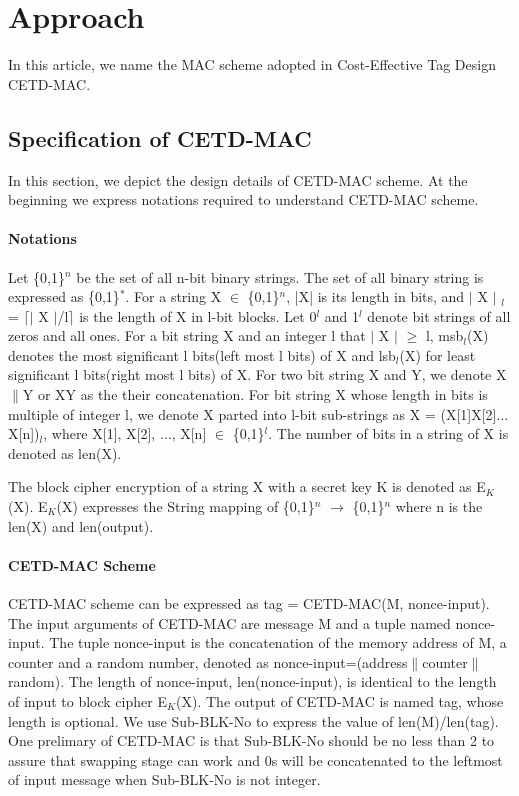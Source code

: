 \documentclass{article}
\begin{document}
\section{Approach}
In this article, we name the MAC scheme adopted in Cost-Effective Tag Design\cite{} CETD-MAC. 
\subsection{Specification of CETD-MAC}
In this section, we depict the design details of CETD-MAC scheme. At the beginning we express notations required to understand CETD-MAC scheme. 

\paragraph{Notations}
Let \{0,1\}$^n$ be the set of all n-bit binary strings. The set of all binary string is expressed as \{0,1\}$^*$.  
For a string X $\in$ \{0,1\}$^n$, |X| is its length in bits, and $\vert$ X $\vert$ $_l$ = $\lceil$$\vert$ X $\vert$/l$\rceil$ is the length of X in l-bit blocks.  Let 0$^l$ and 1$^l$ denote bit strings of all zeros and all ones. 
For a bit string X and an integer l that $\vert$ X $\vert$ $\geq$ l, msb$_l$(X) denotes the most significant l bits(left most l bits) of X and lsb$_l$(X) for least significant l bits(right most l bits) of X.
For two bit string X and Y, we denote X$\|$Y  or XY as the their concatenation. For bit string X whose length in bits is multiple of integer l, we denote X parted into l-bit sub-strings as X = (X[1]X[2]$\ldots$X[n])$_l$, where X[1], X[2], $\ldots$, X[n] $\in$ \{0,1\}$^l$.
The number of bits in a string of X is denoted as len(X).

The block cipher encryption of a string X with a secret key K is denoted as E$_K$(X). E$_K$(X) expresses the String mapping of \{0,1\}$^n$ $\rightarrow$ \{0,1\}$^n$ where n is the len(X) and len(output).
\paragraph{CETD-MAC Scheme}
CETD-MAC scheme can be expressed as tag = CETD-MAC(M, nonce-input). The input arguments of CETD-MAC are message M and a tuple named nonce-input. The tuple nonce-input is the concatenation of the memory address of M, a counter and a random number, denoted as nonce-input=(address$\|$counter$\|$random). The length of nonce-input, len(nonce-input), is identical to the length of input to block cipher E$_K$(X). The output of CETD-MAC is named tag, whose length is optional. We use Sub-BLK-No to express the value of len(M)/len(tag). One prelimary of CETD-MAC is that Sub-BLK-No should be no less than 2 to assure that swapping stage can work and 0s will be concatenated to the leftmost of input message when Sub-BLK-No is not integer.  
\end{document}
